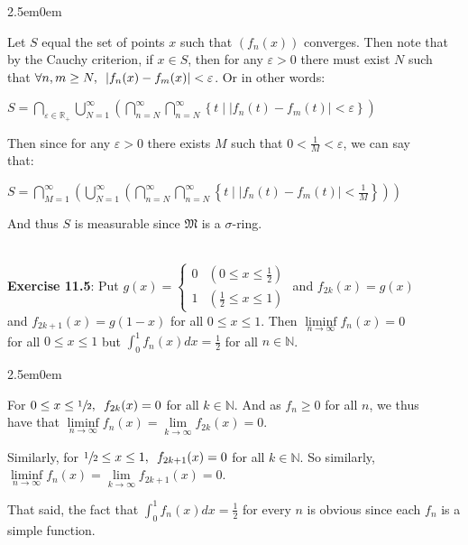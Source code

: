 \documentclass{book}
\newcommand{\exTwo}{%
   \color{RedViolet}%
   \fontsize{13}{15}\selectfont%
}
\newenvironment{myIndent}{%
   \begin{adjustwidth}{2.5em}{0em}%
}{%
   \end{adjustwidth}%
}
\newcommand{\myHS}{ \hspace{0.5em}}
\newcommand{\mySepTwo}[1][.]{%
   {\noindent\color{#1}{\rule{6.5in}{0.5mm}}}\\%
}
\newcommand{\retTwo}{\hfill\bigbreak}
\begin{document}
{\begin{myIndent}\exTwo
   Let $S$ equal the set of points $x$ such that $(f_n(x))$ converges. Then note that\\ by the Cauchy criterion, if $x \in S$, then for any $\varepsilon > 0$ there must exist $N$ such\\ that $\forall n, m\geq N,\myHS |f_n(x) - f_m(x)| < \varepsilon$. Or in other words:

   {\centering $S = \bigcap\limits_{\varepsilon \in \mathbb{R}_+}\bigcup\limits_{N=1}^\infty\left(\bigcap\limits_{n=N}^\infty \bigcap\limits_{n=N}^\infty \left\{t \mid |f_n(t) - f_m(t)| < \varepsilon \right\}\right)$ \retTwo\par}

   Then since for any $\varepsilon > 0$ there exists $M$ such that $0 < \frac{1}{M} < \varepsilon$, we can say\\ that:

   {\centering $S = \bigcap\limits_{M=1}^\infty\left(\bigcup\limits_{N=1}^\infty\left(\bigcap\limits_{n=N}^\infty \bigcap\limits_{n=N}^\infty \left\{t \mid |f_n(t) - f_m(t)| < \frac{1}{M} \right\}\right)\right)$ \retTwo\par}

   And thus $S$ is measurable since $\mathfrak{M}$ is a $\sigma$-ring.
   \retTwo
\end{myIndent}}

\mySepTwo

\textbf{Exercise 11.5}: Put $g(x) = \left\{
\begin{matrix}
   0 & (0 \leq x \leq \frac{1}{2}) \\ 1 & (\frac{1}{2} \leq x \leq 1)
\end{matrix}\right.$ and $f_{2k}(x) = g(x)$\\ [2pt] and $f_{2k + 1}(x) = g(1-x)$ for all $0 \leq x \leq 1$. Then $\liminf\limits_{n\rightarrow \infty} f_n(x) = 0$\\ for all $0 \leq x \leq 1$ but $\int_0^1 f_n(x)dx = \frac{1}{2}$ for all $n \in \mathbb{N}$.\\ [-6pt]

{\begin{myIndent}\exTwo
   For $0 \leq x \leq \sfrac{1}{2},\myHS f_{2k}(x) = 0$ for all $k \in \mathbb{N}$. And as $f_n \geq 0$ for all $n$, we thus\\ have that $\liminf\limits_{n\rightarrow \infty} f_n(x) = \lim\limits_{k \rightarrow \infty} f_{2k}(x) = 0$.\retTwo

   Similarly, for $\sfrac{1}{2} \leq x \leq 1,\myHS f_{2k+1}(x) = 0$ for all $k \in \mathbb{N}$. So similarly,\\ $\liminf\limits_{n\rightarrow \infty} f_n(x) = \lim\limits_{k \rightarrow \infty} f_{2k+1}(x) = 0$.\retTwo

   That said, the fact that $\int_0^1 f_n(x)dx = \frac{1}{2}$ for every $n$ is obvious since each $f_n$ is a simple function.\retTwo
\end{myIndent}}
\end{document}
